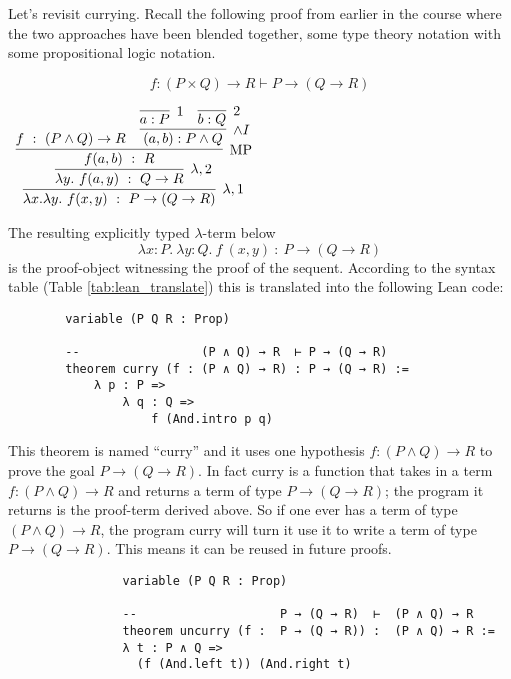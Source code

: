 \documentclass{book}
\begin{document}
    \begin{eg} [Currying] Let's revisit currying. Recall the following proof from earlier in the course where the two approaches have been blended together, some type theory notation with some propositional logic notation.

    $$f : (P\times Q) \rightarrow  R \vdash  P \rightarrow (Q \rightarrow  R)$$		    
        \begin{center}
            $\begin{array}{c}
                \infer[\lambda,1]{\lambda x. \lambda y. \ f(x,y) \ : \ P\to(Q\to R)}
                    {\infer[\lambda,2]{\lambda y. \ f(a,y) \ : \ Q\to R}
                        {\infer[\MP]{f(a,b) \ : \ R}
                            {f \ : \ (P\land Q) \to R
                            &
                            \infer[\land I]{(a,b) : P\land Q}
                                {\infer[1]{a:P}{}
                                &
                                \infer[2]{b:Q}{}}}}}
            \end{array}$
        \end{center}    

    The resulting explicitly typed $\lambda$-term below
    $$ \lambda x : P. \ \lambda y : Q. \ f \ (x,y) \ : \ P \to (Q \to R)$$
    is the proof-object witnessing the proof of the sequent. According to the syntax table (Table \ref{tab:lean_translate}) this is translated into the following Lean code:

    \begin{lstlisting}
        variable (P Q R : Prop)

        --                 (P ∧ Q) → R  ⊢ P → (Q → R)
        theorem curry (f : (P ∧ Q) → R) : P → (Q → R) :=
            λ p : P =>
                λ q : Q =>
                    f (And.intro p q)
    \end{lstlisting}

    This theorem is named ``curry'' and it uses one hypothesis $f : (P \land Q) \to R$ to prove the goal $P \to (Q \to R)$. In fact curry is a function that takes in a term $f : (P \land Q) \to R$ and returns a term of type $P \to (Q \to R)$; the program it returns is the proof-term derived above. So if one ever has a term of type $(P \land Q) \to R$, the program curry will turn it use it to write a term of type $P \to (Q \to R)$. This means it can be reused in future proofs.
    \end{eg}

    \begin{eg} [Uncurry]
            \begin{lstlisting}
                variable (P Q R : Prop)

                --                    P → (Q → R)  ⊢  (P ∧ Q) → R 
                theorem uncurry (f :  P → (Q → R)) :  (P ∧ Q) → R :=
                λ t : P ∧ Q =>
                  (f (And.left t)) (And.right t)
            \end{lstlisting}
    \end{eg}
\end{document}
